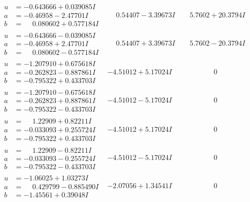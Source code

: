 \documentclass[1p]{elsarticle_modified}
\theoremstyle{definition}
\begin{document}
$$\begin{array}{c|c|c}
\begin{aligned}
u &= -0.643666 + 0.039085 I \\
a &= -0.46958 - 2.47701 I \\
b &= \phantom{-}0.080602 + 0.577184 I\end{aligned}
 & \phantom{-}0.54407 - 3.39673 I & \phantom{-}5.7602 + 20.3794 I \\ \hline\begin{aligned}
u &= -0.643666 - 0.039085 I \\
a &= -0.46958 + 2.47701 I \\
b &= \phantom{-}0.080602 - 0.577184 I\end{aligned}
 & \phantom{-}0.54407 + 3.39673 I & \phantom{-}5.7602 - 20.3794 I \\ \hline\begin{aligned}
u &= -1.207910 + 0.675618 I \\
a &= -0.262823 - 0.887861 I \\
b &= -0.795322 + 0.433703 I\end{aligned}
 & -4.51012 + 5.17024 I & \phantom{-0.000000 } 0 \\ \hline\begin{aligned}
u &= -1.207910 - 0.675618 I \\
a &= -0.262823 + 0.887861 I \\
b &= -0.795322 - 0.433703 I\end{aligned}
 & -4.51012 - 5.17024 I & \phantom{-0.000000 } 0 \\ \hline\begin{aligned}
u &= \phantom{-}1.22909 + 0.82211 I \\
a &= -0.033093 + 0.255724 I \\
b &= -0.795322 + 0.433703 I\end{aligned}
 & -4.51012 + 5.17024 I & \phantom{-0.000000 } 0 \\ \hline\begin{aligned}
u &= \phantom{-}1.22909 - 0.82211 I \\
a &= -0.033093 - 0.255724 I \\
b &= -0.795322 - 0.433703 I\end{aligned}
 & -4.51012 - 5.17024 I & \phantom{-0.000000 } 0 \\ \hline\begin{aligned}
u &= -1.06025 + 1.03273 I \\
a &= \phantom{-}0.429799 - 0.885490 I \\
b &= -1.45561 + 0.39048 I\end{aligned}
 & -2.07056 + 1.34541 I & \phantom{-0.000000 } 0 \\ \hline\begin{aligned}

\end{aligned}
\end{array}$$
\end{document}
